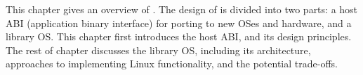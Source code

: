 This chapter gives an overview of \graphene{}.
The design of \graphene{} is divided into two parts:
a host ABI (application binary interface) for porting to new OSes and hardware,
and a library OS. %
This chapter first introduces the host ABI, and its design principles.
The rest of chapter
discusses the library OS, including its architecture,
approaches to implementing Linux functionality,
and the potential trade-offs. %


